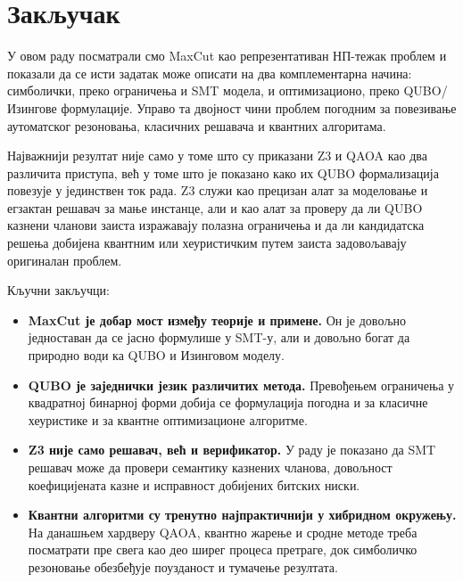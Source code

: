 \section{Закључак}
\label{sec:zakljucak}

У овом раду посматрали смо MaxCut као репрезентативан НП-тежак
проблем и показали да се исти задатак може описати на два
комплементарна начина: симболички, преко ограничења и SMT модела,
и оптимизационо, преко QUBO/Изингове формулације. Управо та двојност
чини проблем погодним за повезивање аутоматског резоновања,
класичних решавача и квантних алгоритама.

Најважнији резултат није само у томе што су приказани Z3 и
QAOA као два различита приступа, већ у томе што је показано како их
QUBO формализација повезује у јединствен ток рада. Z3 служи као
прецизан алат за моделовање и егзактан решавач за мање инстанце, али и као
алат за проверу да ли QUBO казнени чланови заиста изражавају
полазна ограничења и да ли кандидатска решења добијена квантним
или хеуристичким путем заиста задовољавају оригиналан проблем.

Кључни закључци:

\begin{itemize}[leftmargin=1.5em]
  \item \textbf{MaxCut је добар мост између теорије и примене.}
        Он је довољно једноставан да се јасно формулише у SMT-у,
        али и довољно богат да природно води ка QUBO и Изинговом
        моделу.
  \item \textbf{QUBO је заједнички језик различитих метода.}
        Превођењем ограничења у квадратној бинарној форми добија се
        формулација погодна и за класичне хеуристике и за квантне
        оптимизационе алгоритме.
  \item \textbf{Z3 није само решавач, већ и верификатор.}
        У раду је показано да SMT решавач може да провери семантику
        казнених чланова, довољност коефицијената казне и исправност
        добијених битских ниски.
  \item \textbf{Квантни алгоритми су тренутно најпрактичнији у хибридном
        окружењу.} На данашњем хардверу QAOA, квантно жарење и
         сродне методе треба посматрати пре свега као део ширег процеса 
        претраге, док симболичко резоновање обезбеђује поузданост и тумачење
        резултата.
\end{itemize}

